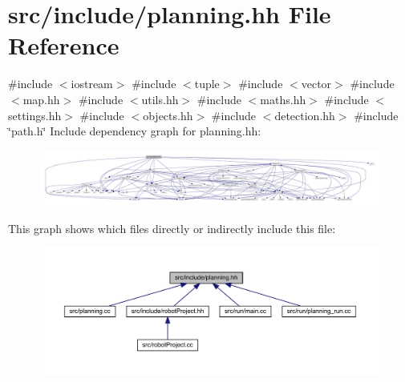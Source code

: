 \hypertarget{planning_8hh}{}\section{src/include/planning.hh File Reference}
\label{planning_8hh}
{\ttfamily \#include $<$iostream$>$}\newline
{\ttfamily \#include $<$tuple$>$}\newline
{\ttfamily \#include $<$vector$>$}\newline
{\ttfamily \#include $<$map.\+hh$>$}\newline
{\ttfamily \#include $<$utils.\+hh$>$}\newline
{\ttfamily \#include $<$maths.\+hh$>$}\newline
{\ttfamily \#include $<$settings.\+hh$>$}\newline
{\ttfamily \#include $<$objects.\+hh$>$}\newline
{\ttfamily \#include $<$detection.\+hh$>$}\newline
{\ttfamily \#include \char`\"{}path.\+h\char`\"{}}\newline
Include dependency graph for planning.\+hh\+:
\nopagebreak
\begin{figure}[H]
\begin{center}
\leavevmode
\includegraphics[width=350pt]{planning_8hh__incl}
\end{center}
\end{figure}
This graph shows which files directly or indirectly include this file\+:
\nopagebreak
\begin{figure}[H]
\begin{center}
\leavevmode
\includegraphics[width=350pt]{planning_8hh__dep__incl}
\end{center}
\end{figure}
